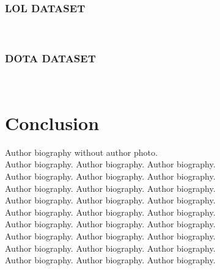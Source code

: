 \documentclass[a4paper,fleqn]{cas-sc}
\begin{document}
\subsubsection{LOL DATASET}
\\
\subsubsection{DOTA DATASET}
\\

\section{Conclusion}


\par
\printcredits

% 






\bio{}
Author biography without author photo.\\
Author biography. Author biography. Author biography.\\
Author biography. Author biography. Author biography.\\
Author biography. Author biography. Author biography.\\
Author biography. Author biography. Author biography.\\
Author biography. Author biography. Author biography.\\
Author biography. Author biography. Author biography.\\
Author biography. Author biography. Author biography.\\
Author biography. Author biography. Author biography.\\
Author biography. Author biography. Author biography.\\
\endbio
\end{document}
